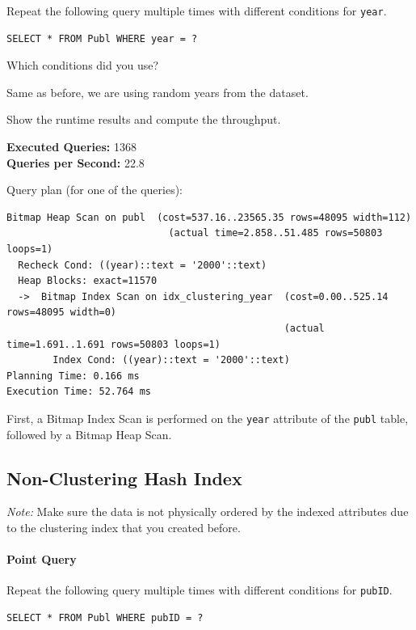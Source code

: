 \documentclass[11pt]{scrartcl}
\begin{document}
Repeat the following query multiple times with different conditions for \texttt{year}.

\begin{lstlisting}[style=dbtsql]
SELECT * FROM Publ WHERE year = ?
\end{lstlisting}

Which conditions did you use?

Same as before, we are using random years from the dataset.

Show the runtime results and compute the throughput.

\textbf{Executed Queries: } 1368\\
\textbf{Queries per Second: } 22.8

Query plan (for one of the queries):

{\small
\parskip0pt\begin{verbatim}
Bitmap Heap Scan on publ  (cost=537.16..23565.35 rows=48095 width=112)
                            (actual time=2.858..51.485 rows=50803 loops=1)
  Recheck Cond: ((year)::text = '2000'::text)
  Heap Blocks: exact=11570
  ->  Bitmap Index Scan on idx_clustering_year  (cost=0.00..525.14 rows=48095 width=0)
                                                (actual time=1.691..1.691 rows=50803 loops=1)
        Index Cond: ((year)::text = '2000'::text)
Planning Time: 0.166 ms
Execution Time: 52.764 ms
\end{verbatim}}

First, a Bitmap Index Scan is performed on the \texttt{year} attribute of the \texttt{publ} table, followed by a Bitmap
Heap Scan.

\subsection*{Non-Clustering Hash Index}

\emph{Note:} Make sure the data is not physically ordered by the indexed attributes due to the clustering index that you created before.

\paragraph{Point Query}

Repeat the following query multiple times with different conditions for \texttt{pubID}.

\begin{lstlisting}[style=dbtsql]
SELECT * FROM Publ WHERE pubID = ?
\end{lstlisting}
\end{document}
